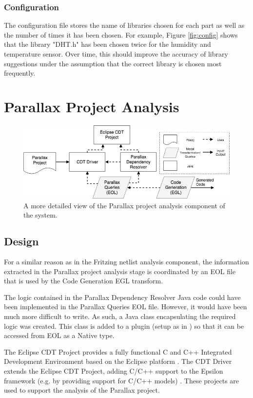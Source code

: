 \documentclass{UoYCSproject}
\begin{document}
\subsubsection{Configuration}
The configuration file stores the name of libraries chosen for each part as well as the number of times it has been chosen. For example, Figure \ref{fig:config} shows that the library "DHT.h" has been chosen twice for the humidity and temperature sensor. Over time, this should improve the accuracy of library suggestions under the assumption that the correct library is chosen most frequently.

\section{Parallax Project Analysis} \label{parallax_design}
\begin{figure}[h!]
  \centering
  \includegraphics[width=0.8\linewidth]{graphics/parallax_project_analysis.png}
  \caption{A more detailed view of the Parallax project analysis component of the system.}
  \label{fig:parallax_analysis}
\end{figure}

\subsection{Design}
For a similar reason as in the Fritzing netlist analysis component, the information extracted in the Parallax project analysis stage is coordinated by an EOL file that is used by the Code Generation EGL transform. 

The logic contained in the Parallax Dependency Resolver Java code could have been implemented in the Parallax Queries EOL file. However, it would have been much more difficult to write. As such, a Java class encapsulating the required logic was created. This class is added to a plugin (setup as in \parencite{eol_tool}) so that it can be accessed from EOL as a Native type.

The Eclipse CDT Project provides a fully functional C and C++ Integrated Development Environment based on the Eclipse platform \parencite{eclipse_cdt}. The CDT Driver extends the Eclipse CDT Project, adding C/C++ support to the Epsilon framework (e.g. by providing support for C/C++ models) \parencite{cdt_driver}. These projects are used to support the analysis of the Parallax project.
\end{document}
